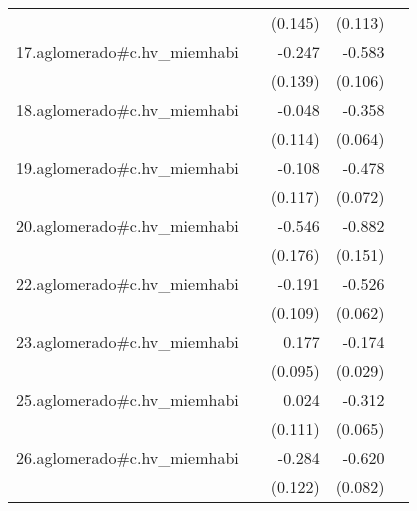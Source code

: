 {\begin{longtable}{l*{4}{D{.}{.}{-1}}}
            &                     &     (0.145)         &     (0.113)         &                     \\
\addlinespace
17.aglomerado#c.hv\_miemhabi&                     &      -0.247         &      -0.583\sym{***}&                     \\
            &                     &     (0.139)         &     (0.106)         &                     \\
\addlinespace
18.aglomerado#c.hv\_miemhabi&                     &      -0.048         &      -0.358\sym{***}&                     \\
            &                     &     (0.114)         &     (0.064)         &                     \\
\addlinespace
19.aglomerado#c.hv\_miemhabi&                     &      -0.108         &      -0.478\sym{***}&                     \\
            &                     &     (0.117)         &     (0.072)         &                     \\
\addlinespace
20.aglomerado#c.hv\_miemhabi&                     &      -0.546\sym{**} &      -0.882\sym{***}&                     \\
            &                     &     (0.176)         &     (0.151)         &                     \\
\addlinespace
22.aglomerado#c.hv\_miemhabi&                     &      -0.191         &      -0.526\sym{***}&                     \\
            &                     &     (0.109)         &     (0.062)         &                     \\
\addlinespace
23.aglomerado#c.hv\_miemhabi&                     &       0.177         &      -0.174\sym{***}&                     \\
            &                     &     (0.095)         &     (0.029)         &                     \\
\addlinespace
25.aglomerado#c.hv\_miemhabi&                     &       0.024         &      -0.312\sym{***}&                     \\
            &                     &     (0.111)         &     (0.065)         &                     \\
\addlinespace
26.aglomerado#c.hv\_miemhabi&                     &      -0.284\sym{*}  &      -0.620\sym{***}&                     \\
            &                     &     (0.122)         &     (0.082)         &                     \\

\end{longtable}}
